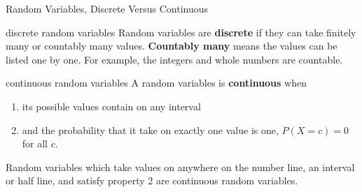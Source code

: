 \documentclass[]{beamer}
\begin{document}
\begin{frame}{Random Variables, Discrete Versus Continuous}
    \begin{block}{discrete random variables}
        Random variables are \textbf{discrete} if they can take finitely many or countably many values. \textbf{Countably many} means the values can be listed one by one. For example, the integers and whole numbers are countable.
    \end{block}
    \begin{block}{continuous random variables}
        A random variables is \textbf{continuous} when
        \begin{enumerate}
            \item its possible values contain on any interval
            \item and the probability that it take on exactly one value is one, $P(X=c) = 0$ for all $c$.
        \end{enumerate}
        Random variables which take values on anywhere on the number line, an interval or half line, and satisfy property 2 are continuous random variables.
    \end{block}
\end{frame}

\end{document}
